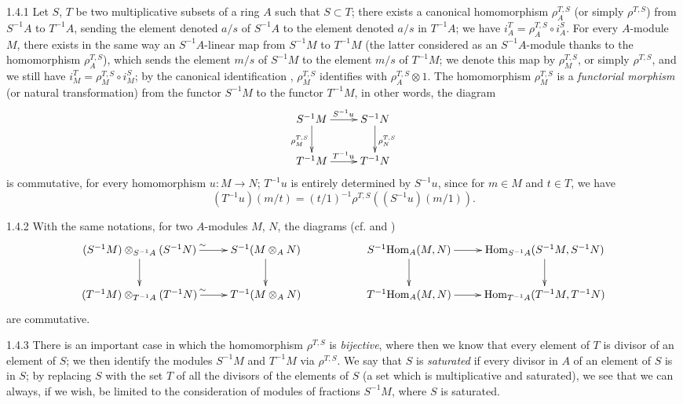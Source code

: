 \begin{env}{1.4.1}
\label{env-0.1.4.1}
Let $S$, $T$ be two multiplicative subsets of a ring $A$ such that $S\subset T$;
there exists a canonical homomorphism $\rho_A^{T,S}$ (or simply $\rho^{T,S}$)
from $S^{-1}A$ to $T^{-1}A$, sending the element denoted $a/s$ of $S^{-1}A$ to
the element denoted $a/s$ in $T^{-1}A$; we have $i_A^T=\rho_A^{T,S}\circ i_A^S$.
For every $A$-module $M$, there exists in the same way an $S^{-1}A$-linear map
from $S^{-1}M$ to $T^{-1}M$ (the latter considered as an $S^{-1}A$-module thanks
to the homomorphism $\rho_A^{T,S}$), which sends the element $m/s$ of $S^{-1}M$
to the element $m/s$ of $T^{-1}M$; we denote this map by $\rho_M^{T,S}$, or
simply $\rho^{T,S}$, and we still have $i_M^T=\rho_M^{T,S}\circ i_M^S$; by the
canonical identification , $\rho_M^{T,S}$ identifies with
$\rho_A^{T,S}\otimes 1$. The homomorphism $\rho_M^{T,S}$ is a \emph{functorial
morphism} (or natural transformation) from the functor $S^{-1}M$ to the functor
$T^{-1}M$, in other words, the diagram
\[
  \xymatrix{
  S^{-1}M\ar[r]^{S^{-1}u}\ar[d]_{\rho_M^{T,S}} &
  S^{-1}N\ar[d]^{\rho_N^{T,S}}\\
  T^{-1}M\ar[r]^{T^{-1}u} &
  T^{-1}N
  }
\]
is commutative, for every homomorphism $u:M\to N$; $T^{-1}u$ is entirely
determined by $S^{-1}u$, since for $m\in M$ and $t\in T$, we have
\[
  (T^{-1}u)(m/t)=(t/1)^{-1}\rho^{T,S}((S^{-1}u)(m/1)).
\]
\end{env}

\begin{env}{1.4.2}
\label{env-0.1.4.2}
With the same notations, for two $A$-modules $M$, $N$, the diagrams
(cf.  and )
\[
  \xymatrix{
    (S^{-1}M)\otimes_{S^{-1}A}(S^{-1}N)\ar[r]^\sim \ar[d] &
    S^{-1}(M\otimes_A N)\ar[d] & &
    S^{-1}\Hom_A(M,N)\ar[r]\ar[d] &
    \Hom_{S^{-1}A}(S^{-1}M,S^{-1}N)\ar[d]\\
    (T^{-1}M)\otimes_{T^{-1}A}(T^{-1}N)\ar[r]^\sim &
    T^{-1}(M\otimes_A N) & &
    T^{-1}\Hom_A(M,N)\ar[r] &
    \Hom_{T^{-1}A}(T^{-1}M,T^{-1}N)
  }
\]
are commutative.
\end{env}

\begin{env}{1.4.3}
\label{env-0.1.4.3}
There is an important case in which the homomorphism $\rho^{T,S}$ is
\emph{bijective}, where then we know that every element of $T$ is divisor of an
element of $S$; we then identify the modules $S^{-1}M$ and $T^{-1}M$ via
$\rho^{T,S}$. We say that $S$ is \emph{saturated} if every divisor in $A$ of an
element of $S$ is in $S$; by replacing $S$ with  the set $T$ of all the divisors
of the elements of $S$ (a set which is multiplicative and saturated), we see
that we can always, if we wish, be limited to the consideration of modules of
fractions $S^{-1}M$, where $S$ is saturated.
\end{env}

